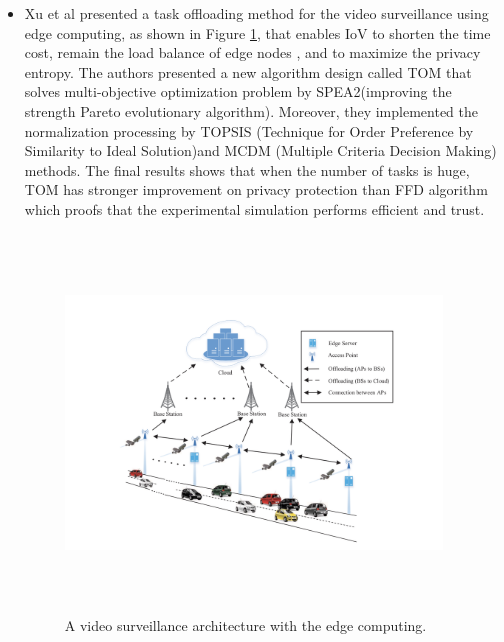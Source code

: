 \documentclass[12pt]{article}
\begin{document}
\begin{itemize}
\newpage

\item Xu et al\cite{9126126} presented a task offloading method for the video surveillance using edge computing, as shown in Figure \ref{edge}, that enables IoV to shorten the time cost, remain the load balance of edge nodes , and to maximize the privacy entropy. The authors presented a new algorithm design called TOM that solves multi-objective optimization problem by SPEA2(improving the strength Pareto evolutionary algorithm). Moreover, they implemented the normalization processing by TOPSIS (Technique for Order Preference by Similarity to Ideal Solution)and MCDM (Multiple Criteria Decision Making) methods. The final results shows that when the number of tasks is huge, TOM has stronger improvement on privacy protection than FFD algorithm which proofs that the experimental simulation performs efficient and trust.

\begin{figure}[!ht]
\centering
 \begin{minipage}{.5\textwidth}
  \includegraphics[width=10.0cm, height=10.0cm]{./12.png}
  \caption{A video surveillance architecture with the edge computing.}
  \label{edge}
 \end{minipage}
\end{figure}


\end{itemize}
\end{document}

